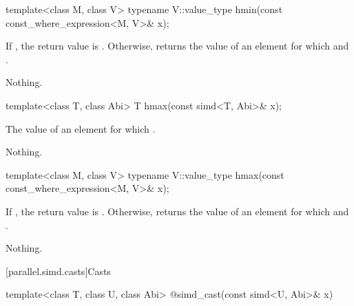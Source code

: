 \begin{itemdecl}
template<class M, class V> typename V::value_type hmin(const const_where_expression<M, V>& x);
\end{itemdecl}

\begin{itemdescr}
  \pnum\returns
  If , the return value is . Otherwise, returns the value of an element  for which  and  \forallmaskedi.

  \pnum\throws Nothing.
\end{itemdescr}

\begin{itemdecl}
template<class T, class Abi> T hmax(const simd<T, Abi>& x);
\end{itemdecl}

\begin{itemdescr}
  \pnum\returns
  The value of an element  for which  \foralli.

  \pnum\throws Nothing.
\end{itemdescr}

\begin{itemdecl}
template<class M, class V> typename V::value_type hmax(const const_where_expression<M, V>& x);
\end{itemdecl}

\begin{itemdescr}
  \pnum\returns
  If , the return value is . Otherwise, returns the value of an element  for which  and  \forallmaskedi.

  \pnum\throws Nothing.
\end{itemdescr}

[parallel.simd.casts]{Casts}

\begin{itemdecl}
template<class T, class U, class Abi> @\seebelow@ simd_cast(const simd<U, Abi>& x)
\end{itemdecl}

